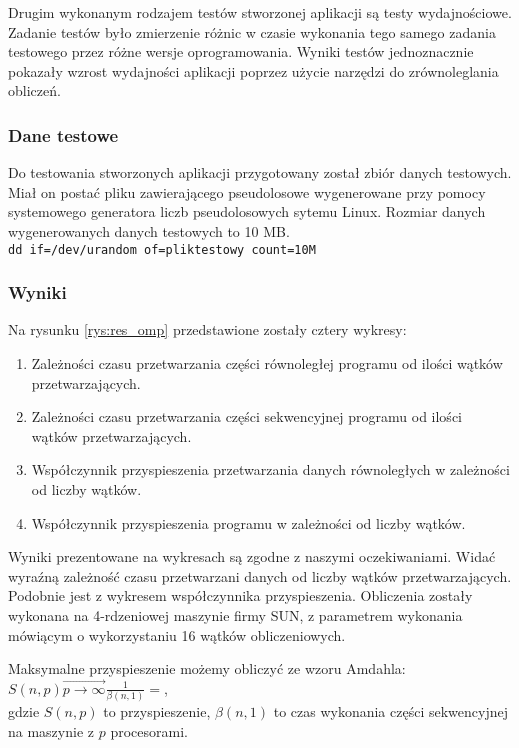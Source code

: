 \documentclass[a4paper,12pt]{article}
\begin{document}
Drugim wykonanym rodzajem testów stworzonej aplikacji są testy wydajnościowe. Zadanie testów było zmierzenie różnic w czasie wykonania tego samego zadania testowego przez różne wersje oprogramowania. Wyniki testów jednoznacznie pokazały wzrost wydajności aplikacji poprzez użycie narzędzi do zrównoleglania obliczeń.

\subsubsection{Dane testowe}

Do testowania stworzonych aplikacji przygotowany został zbiór danych testowych. Miał on postać pliku zawierającego pseudolosowe wygenerowane przy pomocy systemowego generatora liczb pseudolosowych sytemu Linux. Rozmiar danych wygenerowanych danych testowych to 10 MB.\\
\texttt{dd if=/dev/urandom of=pliktestowy count=10M}



\subsubsection{Wyniki}
Na rysunku \ref{rys:res_omp} przedstawione zostały cztery wykresy:
\begin{enumerate}
\item Zależności czasu przetwarzania części równoległej programu od ilości wątków przetwarzających.
\item Zależności czasu przetwarzania części sekwencyjnej programu od ilości wątków przetwarzających.
\item Współczynnik przyspieszenia przetwarzania danych równoległych w zależności od liczby wątków.
\item Współczynnik przyspieszenia programu w zależności od liczby wątków.
\end{enumerate}

Wyniki prezentowane na wykresach są zgodne z naszymi oczekiwaniami. Widać wyraźną zależność czasu przetwarzani danych od liczby wątków przetwarzających. Podobnie jest z wykresem współczynnika przyspieszenia. Obliczenia zostały wykonana na 4-rdzeniowej maszynie firmy SUN, z parametrem wykonania mówiącym o wykorzystaniu 16 wątków obliczeniowych.

Maksymalne przyspieszenie możemy obliczyć ze wzoru Amdahla:\\
$S(n,p)\overrightarrow{p \rightarrow \infty } \frac{1}{\beta(n, 1)} = $, \\
gdzie $S(n,p)$ to przyspieszenie, $\beta(n, 1)$ to czas wykonania części sekwencyjnej na maszynie z $p$ procesorami.
\end{document}

